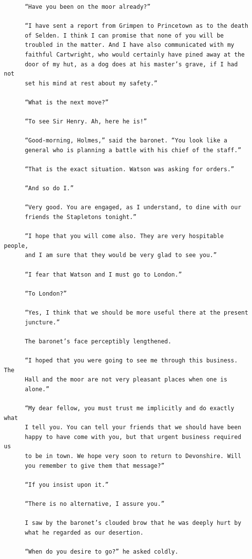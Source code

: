 \documentclass{article}
\begin{document}
\begin{verbatim}
      “Have you been on the moor already?”

      “I have sent a report from Grimpen to Princetown as to the death
      of Selden. I think I can promise that none of you will be
      troubled in the matter. And I have also communicated with my
      faithful Cartwright, who would certainly have pined away at the
      door of my hut, as a dog does at his master’s grave, if I had not
      set his mind at rest about my safety.”

      “What is the next move?”

      “To see Sir Henry. Ah, here he is!”

      “Good-morning, Holmes,” said the baronet. “You look like a
      general who is planning a battle with his chief of the staff.”

      “That is the exact situation. Watson was asking for orders.”

      “And so do I.”

      “Very good. You are engaged, as I understand, to dine with our
      friends the Stapletons tonight.”

      “I hope that you will come also. They are very hospitable people,
      and I am sure that they would be very glad to see you.”

      “I fear that Watson and I must go to London.”

      “To London?”

      “Yes, I think that we should be more useful there at the present
      juncture.”

      The baronet’s face perceptibly lengthened.

      “I hoped that you were going to see me through this business. The
      Hall and the moor are not very pleasant places when one is
      alone.”

      “My dear fellow, you must trust me implicitly and do exactly what
      I tell you. You can tell your friends that we should have been
      happy to have come with you, but that urgent business required us
      to be in town. We hope very soon to return to Devonshire. Will
      you remember to give them that message?”

      “If you insist upon it.”

      “There is no alternative, I assure you.”

      I saw by the baronet’s clouded brow that he was deeply hurt by
      what he regarded as our desertion.

      “When do you desire to go?” he asked coldly.


\end{verbatim}
\end{document}
